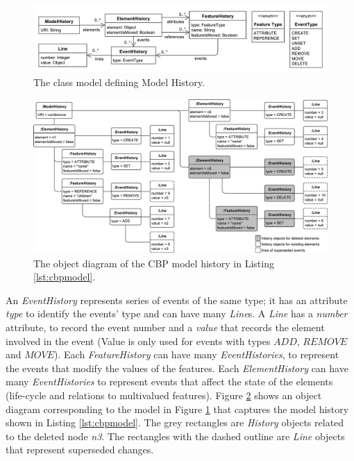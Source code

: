 \documentclass{llncs}
\begin{document}
\vspace{-20pt}    
\begin{figure}[ht]
\centering
\includegraphics[width=\linewidth]{object_history}
\caption{The class model defining Model History.}
\label{fig:object_history}
    \end{figure}

\vspace{-30pt}
\begin{figure}[ht]
\centering
\includegraphics[width=\linewidth]{history_structure}
\caption{The object diagram of the CBP model history in Listing \ref{lst:cbpmodel}.}
\label{fig:history_structure}
\end{figure}
    
    
    An \emph{EventHistory} represents series of events of the same type; it has an attribute \emph{type} to identify the events' type and can have many \emph{Line}s. A \emph{Line} has a \emph{number} attribute, to record the event number and a \emph{value} that records the element involved in the event (Value is only used for events with types \emph{$ADD$}, \emph{$REMOVE$} and \emph{$MOVE$}). Each \emph{FeatureHistory} can have many \emph{EventHistories}, to represent the events that modify the values of the features. Each \emph{ElementHistory} can have many \emph{EventHistories} to represent events that affect the state of the elements (life-cycle and relations to multivalued features). Figure \ref{fig:history_structure} shows an object diagram corresponding to the model in Figure \ref{fig:object_history} that captures the model history shown in Listing \ref{lst:cbpmodel}. The grey rectangles are \emph{History} objects related to the deleted node \emph{n3}. The rectangles with the dashed outline are \emph{Line} objects that represent superseded changes. 
    
\end{document}
